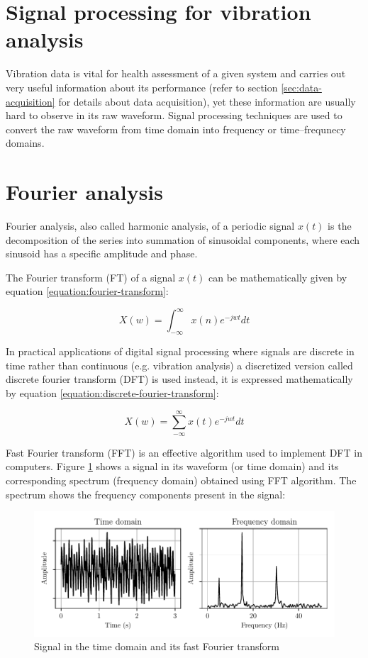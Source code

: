 
\section{Signal processing for vibration analysis}
Vibration data is vital for health assessment of a given system and carries out very useful information about its performance (refer to section \ref{sec:data-acquisition} for details about data acquisition), yet these information are usually hard to observe in its raw waveform. Signal processing techniques are used to convert the raw waveform from time domain into frequency or time–frequnecy domains.

\section{Fourier analysis}
Fourier analysis, also called harmonic analysis, of a periodic signal $x(t)$ is the decomposition of the series into summation of sinusoidal components, where each sinusoid has a specific amplitude and phase.

The Fourier transform (FT) of a signal $x(t)$ can be mathematically given by equation \ref{equation:fourier-transform}:

\begin{equation}
    X(w) = \int_{-\infty}^{\infty}x(n)e^{-jwt}dt
    \label{equation:fourier-transform}
\end{equation}

In practical applications of digital signal processing where signals are discrete in time rather than continuous (e.g. vibration analysis) a discretized version called discrete fourier transform (DFT) is used instead, it is expressed mathematically by equation \ref{equation:discrete-fourier-transform}:

\begin{equation}
    X(w) = \sum_{-\infty}^{\infty}x(t)e^{-jwt}dt
    \label{equation:discrete-fourier-transform}
\end{equation}

Fast Fourier transform (FFT) is an effective algorithm used to implement DFT in computers. Figure \ref{figure:fft} shows a signal in its waveform (or time domain) and its corresponding spectrum (frequency domain) obtained using FFT algorithm. The spectrum shows the frequency components present in the signal:

\begin{figure}[H]
    \centering
    \includegraphics{figures/fft.pdf}
    \caption{Signal in the time domain and its fast Fourier transform}
    \label{figure:fft}
\end{figure}

